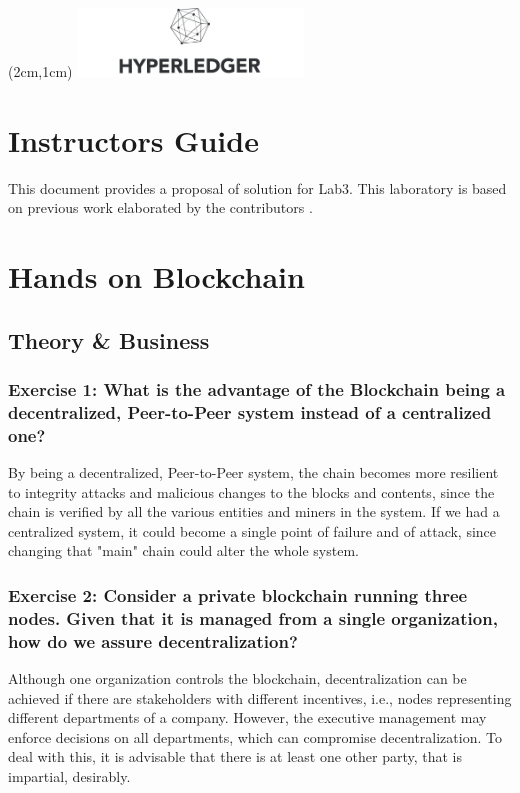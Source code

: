 \documentclass[12pt,a4paper]{article}
\begin{document}
\textblockorigin{-34pt}{-12pt}
\begin{textblock*}{10cm}(2cm,1cm)
\includegraphics[width=6cm]{hyperledger.png}
\end{textblock*}

\section*{Instructors Guide}
This document provides a proposal of solution for Lab3. This laboratory is based on previous work elaborated by the contributors \cite{belchior2019_audits,belchior2020,belchior2019_thesis}.

\section{Hands on Blockchain}
\subsection{Theory \& Business}

\subsubsection*{Exercise 1: What is the advantage of the Blockchain being a decentralized, Peer-to-Peer system instead of a centralized one?}

By being a decentralized, Peer-to-Peer system, the chain becomes more resilient to integrity attacks and malicious changes to the blocks and contents, since the chain is verified by all the various entities and miners in the system. If we had a centralized system, it could become a single point of failure and of attack, since changing that "main" chain could alter the whole system.

\subsubsection*{Exercise 2: Consider a private blockchain running three nodes. Given that it is managed from a single organization, how do we assure decentralization?}

Although one organization controls the blockchain, decentralization can be achieved if there are stakeholders with different incentives, i.e., nodes representing different departments of a company. However, the executive management may enforce decisions on all departments, which can compromise decentralization. To deal with this, it is advisable that there is at least one other party, that is impartial, desirably.
\end{document}
